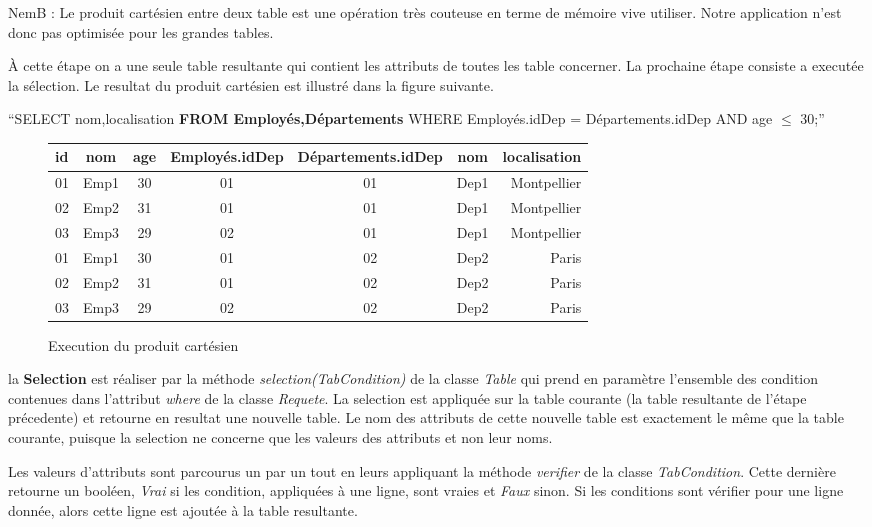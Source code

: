 \documentclass[oneside,13pt,a4paper]{report}
\newcommand\nb[1][0.3]{N\kern-#1emB : }
\begin{document}
\nb Le produit cartésien entre deux table est une opération très couteuse en terme de mémoire vive utiliser. Notre application n'est donc pas optimisée pour les grandes tables.

À cette étape on a une seule table resultante qui contient les attributs de toutes les table concerner. La prochaine étape consiste a executée la sélection. Le resultat du produit cartésien est illustré dans la figure suivante.
\begin{center}
	\enquote{SELECT nom,localisation \textbf{FROM Employés,Départements} WHERE Employés.idDep = Départements.idDep AND age $\leq$ 30;}
	\begin{figure}[h!]
		\centering
		\caption{Execution du produit cartésien}
		\begin{tabular}{|l|c|c|c|c|c|r|}
			\hline
			id & nom  & age & Employés.idDep & Départements.idDep & nom  & localisation
			\\
			\hline
			01 & Emp1 & 30  & 01             & 01                 & Dep1 & Montpellier  \\
			02 & Emp2 & 31  & 01             & 01                 & Dep1 & Montpellier  \\
			03 & Emp3 & 29  & 02             & 01                 & Dep1 & Montpellier  \\
			01 & Emp1 & 30  & 01             & 02                 & Dep2 & Paris        \\
			02 & Emp2 & 31  & 01             & 02                 & Dep2 & Paris        \\
			03 & Emp3 & 29  & 02             & 02                 & Dep2 & Paris        \\
			\hline
		\end{tabular}
	\end{figure}
\end{center}

la \textbf{Selection} est réaliser par la méthode \textit{selection(TabCondition)} de la classe \textit{Table} qui prend en paramètre l'ensemble des condition contenues dans l'attribut \textit{where} de la classe \textit{Requete}. La selection est appliquée sur la table courante (la table resultante de l'étape précedente) et retourne en resultat une nouvelle table. Le nom des attributs de cette nouvelle table est exactement le même que la table courante, puisque la selection ne concerne que les valeurs des attributs et non leur noms.

Les valeurs d'attributs sont parcourus un par un tout en leurs appliquant la méthode \textit{verifier} de la classe \textit{TabCondition}. Cette dernière retourne un booléen, \textit{Vrai} si les condition, appliquées à une ligne, sont vraies et \textit{Faux} sinon. Si les conditions sont vérifier pour une ligne donnée, alors cette ligne est ajoutée à la table resultante.
\end{document}
